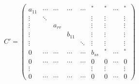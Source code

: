 \documentclass[10pt,fleqn]{article}
\def \distance {1cm}
\begin{document}
    \vspace{\distance}

    \begin{minipage}{\linewidth}
        \centering
        \(
            C' = \left(\begin{array}{cccccc|ccc}
                a_{11} & \cdots & \cdots & \cdots & \cdots & ^* & ^* & \cdots & ^*\\
                \vdots & \ddots & & & & \vdots & \vdots & & \vdots\\
                \vdots & & a_{rr} & & & \vdots & \vdots & & \vdots\\
                \vdots & & & b_{11} & & \vdots & \vdots & & \vdots\\
                \vdots & & & & \ddots & \vdots & \vdots & & \vdots\\
                0 & \cdots & \cdots & \cdots & \cdots & b_{ss} & ^* & \cdots & ^*\\
                \hline
                0 & \cdots & \cdots & \cdots & \cdots & 0 & 0 & \cdots & 0\\
                \vdots & & & & & \vdots & \vdots & & \vdots\\
                0 & \cdots & \cdots & \cdots & \cdots & 0 & 0 & \cdots & 0
            \end{array}\right)
        \)
    \end{minipage}

    \vspace{\distance}
    
\end{document}

